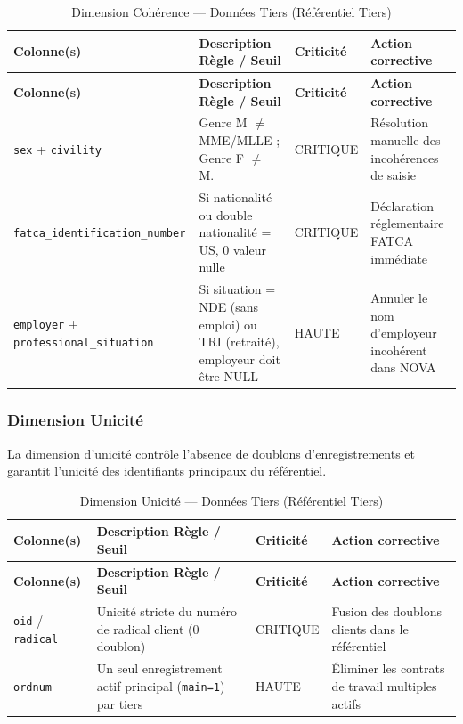 \begin{longtable}{|p{}|p{}|p{}|p{}|}
\caption{Dimension Cohérence — Données Tiers (Référentiel Tiers)} \label{tab:coherence_tiers} \\
\hline
\rowcolor{gray!20}
\textbf{Colonne(s)} & \textbf{Description Règle / Seuil} & \textbf{Criticité} & \textbf{Action corrective} \\
\hline
\endfirsthead
\hline
\rowcolor{gray!20}
\textbf{Colonne(s)} & \textbf{Description Règle / Seuil} & \textbf{Criticité} & \textbf{Action corrective} \\
\hline
\endhead
\texttt{sex} + \texttt{civility} & Genre M $\neq$ MME/MLLE ; Genre F $\neq$ M. & CRITIQUE & Résolution manuelle des incohérences de saisie \\
\hline
\texttt{fatca\_}\allowbreak\texttt{identification\_}\allowbreak\texttt{number} & Si nationalité ou double nationalité = US, 0 valeur nulle & CRITIQUE & Déclaration réglementaire FATCA immédiate \\
\hline
\texttt{employer} + \texttt{professional\_}\allowbreak\texttt{situation} & Si situation = NDE (sans emploi) ou TRI (retraité), employeur doit être NULL & HAUTE & Annuler le nom d'employeur incohérent dans NOVA \\
\hline
\end{longtable}

\subsubsection{Dimension Unicité}
La dimension d'unicité contrôle l'absence de doublons d'enregistrements et garantit l'unicité des identifiants principaux du référentiel.

\begin{longtable}{|p{}|p{}|p{}|p{}|}
\caption{Dimension Unicité — Données Tiers (Référentiel Tiers)} \label{tab:unicite_tiers} \\
\hline
\rowcolor{gray!20}
\textbf{Colonne(s)} & \textbf{Description Règle / Seuil} & \textbf{Criticité} & \textbf{Action corrective} \\
\hline
\endfirsthead
\hline
\rowcolor{gray!20}
\textbf{Colonne(s)} & \textbf{Description Règle / Seuil} & \textbf{Criticité} & \textbf{Action corrective} \\
\hline
\endhead
\texttt{oid} / \texttt{radical} & Unicité stricte du numéro de radical client (0 doublon) & CRITIQUE & Fusion des doublons clients dans le référentiel \\
\hline
\texttt{ordnum} & Un seul enregistrement actif principal (\texttt{main=1}) par tiers & HAUTE & Éliminer les contrats de travail multiples actifs \\
\hline
\end{longtable}

